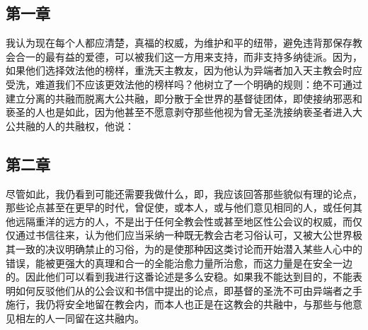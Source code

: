 
\subsection{第一章}

我认为现在每个人都应清楚，真福的权威，为维护和平的纽带，避免违背那保存教会合一的最有益的爱德，可以被我们这一方用来支持，而非支持多纳徒派。因为，如果他们选择效法他的榜样，重洗天主教友，因为他认为异端者加入天主教会时应受洗，难道我们不应该更效法他的榜样吗？他树立了一个明确的规则：绝不可通过建立分离的共融而脱离大公共融，即分散于全世界的基督徒团体，即使接纳邪恶和亵圣的人也是如此，因为他甚至不愿意剥夺那些他视为曾无圣洗接纳亵圣者进入大公共融的人的共融权，他说：\par


\subsection{第二章}

尽管如此，我仍看到可能还需要我做什么，即，我应该回答那些貌似有理的论点，那些论点甚至在更早的时代，曾促使，或本人，或与他们意见相同的人，或任何其他远隔重洋的远方的人，不是出于任何全教会性或甚至地区性公会议的权威，而仅仅通过书信往来，认为他们应当采纳一种既无教会古老习俗认可，又被大公世界极其一致的决议明确禁止的习俗，为的是使那种因这类讨论而开始潜入某些人心中的错误，能被更强大的真理和合一的全能治愈力量所治愈，而这力量是在安全一边的。因此他们可以看到我进行这番论述是多么安稳。如果我不能达到目的，不能表明如何反驳他们从的公会议和书信中提出的论点，即基督的圣洗不可由异端者之手施行，我仍将安全地留在教会内，而本人也正是在这教会的共融中，与那些与他意见相左的人一同留在这共融内。\par

